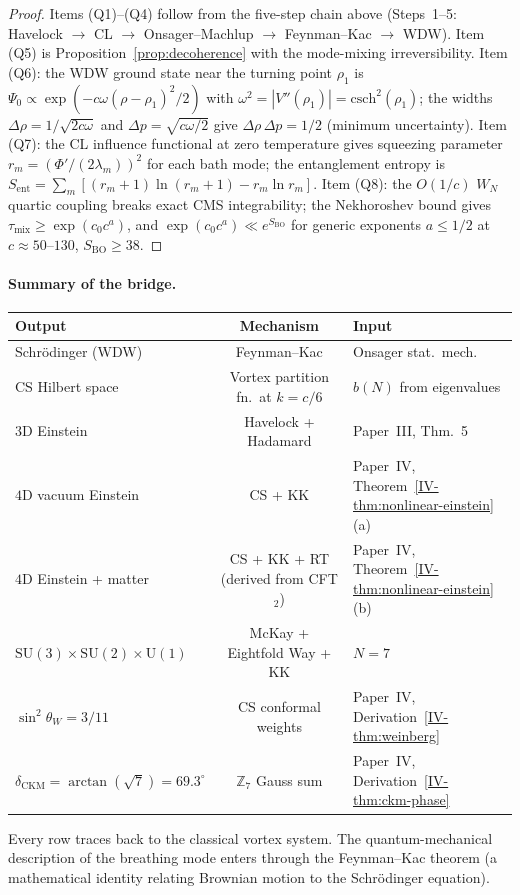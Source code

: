 \begin{proof}
Items (Q1)--(Q4) follow from the five-step chain above
(Steps~1--5: Havelock $\to$ CL $\to$ Onsager--Machlup
$\to$ Feynman--Kac $\to$ WDW).
Item (Q5) is Proposition~\ref{prop:decoherence} with the
mode-mixing irreversibility.
Item (Q6): the WDW ground state near the turning point
$\rho_1$ is $\Psi_0 \propto
\exp(-c\omega(\rho{-}\rho_1)^2/2)$
with $\omega^2 = |V''(\rho_1)| = \mathrm{csch}^2(\rho_1)$;
the widths $\Delta\rho = 1/\!\sqrt{2c\omega}$ and
$\Delta p = \sqrt{c\omega/2}$ give
$\Delta\rho\,\Delta p = 1/2$ (minimum uncertainty).
Item (Q7): the CL influence functional at zero temperature
gives squeezing parameter
$r_m = (\Phi'/(2\lambda_m))^2$ for each bath mode;
the entanglement entropy is
$S_{\mathrm{ent}} = \sum_m [(r_m{+}1)\ln(r_m{+}1)
- r_m\ln r_m]$.
Item (Q8): the $O(1/c)$ $W_N$ quartic coupling
breaks exact CMS integrability; the Nekhoroshev
bound gives $\tau_{\mathrm{mix}} \ge \exp(c_0 c^a)$,
and $\exp(c_0 c^a) \ll e^{S_{\mathrm{BO}}}$
for generic exponents $a \le 1/2$ at
$c \approx 50$--$130$, $S_{\mathrm{BO}} \ge 38$.
\end{proof}

\paragraph{Summary of the bridge.}
\begin{center}
\small
\begin{tabular}{lcl}
\toprule
Output & Mechanism & Input \\
\midrule
Schr\"odinger (WDW) & Feynman--Kac & Onsager stat.\ mech.\ \\
CS Hilbert space & Vortex partition fn.\ at $k=c/6$ & $b(N)$ from eigenvalues \\
$3$D Einstein & Havelock + Hadamard & Paper~III, Thm.\ 5 \\
$4$D vacuum Einstein & CS + KK & Paper~IV, Theorem~\ref*{IV-thm:nonlinear-einstein}(a) \\
$4$D Einstein + matter & CS + KK + RT (derived from CFT$_2$) & Paper~IV, Theorem~\ref*{IV-thm:nonlinear-einstein}(b) \\
$\mathrm{SU}(3) \times \mathrm{SU}(2) \times \mathrm{U}(1)$ &
  McKay + Eightfold Way + KK & $N = 7$ \\
$\sin^2\theta_W = 3/11$ & CS conformal weights & Paper~IV, Derivation~\ref*{IV-thm:weinberg} \\
$\delta_{\mathrm{CKM}} = \arctan(\sqrt{7}) = 69.3^\circ$ & $\mathbb{Z}_7$ Gauss sum & Paper~IV, Derivation~\ref*{IV-thm:ckm-phase} \\
\bottomrule
\end{tabular}
\end{center}
\noindent
Every row traces back to the classical vortex system.
The quantum-mechanical description of the breathing mode
enters through the Feynman--Kac theorem
(a mathematical identity relating Brownian motion to the
Schr\"odinger equation).

